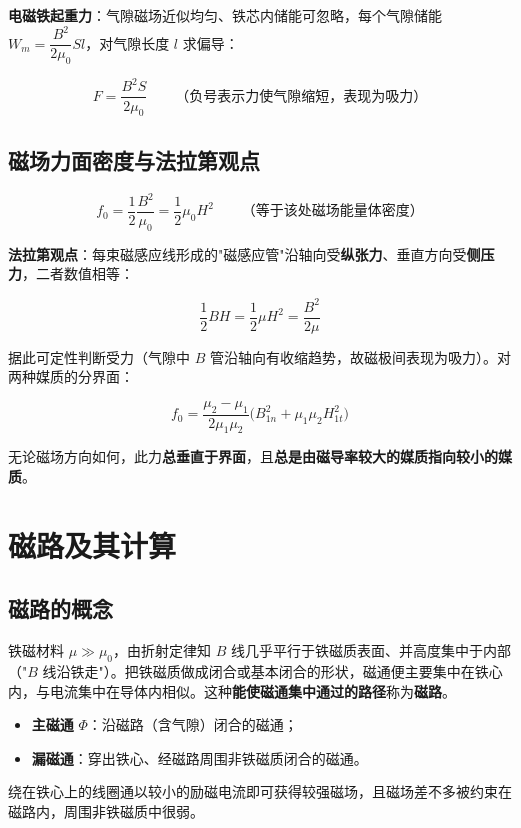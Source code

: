 \textbf{电磁铁起重力}：气隙磁场近似均匀、铁芯内储能可忽略，每个气隙储能 $W_m=\dfrac{B^2}{2\mu_0}Sl$，对气隙长度 $l$ 求偏导：
\begin{formulaBox}
\[
F=\frac{B^2S}{2\mu_0}
\qquad\text{（负号表示力使气隙缩短，表现为吸力）}
\]
\end{formulaBox}

\subsection{磁场力面密度与法拉第观点}
\begin{formulaBox}
\[
f_0=\frac12\frac{B^2}{\mu_0}=\frac12\mu_0H^2
\qquad\text{（等于该处磁场能量体密度）}
\]
\end{formulaBox}
\textbf{法拉第观点}：每束磁感应线形成的"磁感应管"沿轴向受\textbf{纵张力}、垂直方向受\textbf{侧压力}，二者数值相等：
\begin{formulaBox}
\[
\frac12BH=\frac12\mu H^2=\frac{B^2}{2\mu}
\]
\end{formulaBox}
据此可定性判断受力（气隙中 $B$ 管沿轴向有收缩趋势，故磁极间表现为吸力）。对两种媒质的分界面：
\begin{formulaBox}
\[
f_0=\frac{\mu_2-\mu_1}{2\mu_1\mu_2}\big(B_{1n}^2+\mu_1\mu_2H_{1t}^2\big)
\]
\end{formulaBox}
无论磁场方向如何，此力\textbf{总垂直于界面}，且\textbf{总是由磁导率较大的媒质指向较小的媒质}。


\section{磁路及其计算}

\subsection{磁路的概念}
铁磁材料 $\mu\gg\mu_0$，由折射定律知 $B$ 线几乎平行于铁磁质表面、并高度集中于内部（"$B$ 线沿铁走"）。把铁磁质做成闭合或基本闭合的形状，磁通便主要集中在铁心内，与电流集中在导体内相似。这种\textbf{能使磁通集中通过的路径}称为\textbf{磁路}。
\begin{itemize}
  \item \textbf{主磁通} $\Phi$：沿磁路（含气隙）闭合的磁通；
  \item \textbf{漏磁通}：穿出铁心、经磁路周围非铁磁质闭合的磁通。
\end{itemize}
绕在铁心上的线圈通以较小的励磁电流即可获得较强磁场，且磁场差不多被约束在磁路内，周围非铁磁质中很弱。

